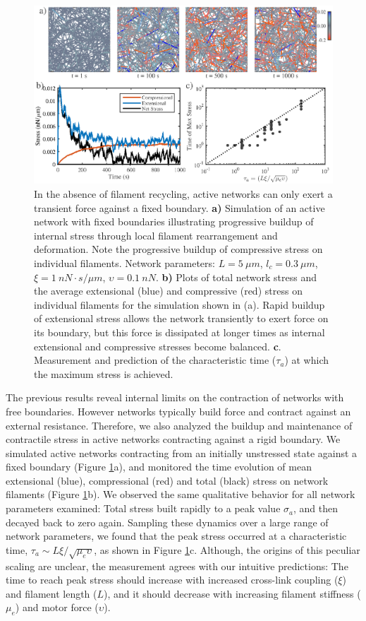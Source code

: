 \documentclass[10pt,letterpaper]{article}
\begin{document}
\begin{figure}[h!]
	\centering
	\includegraphics[width=\hsize]{figures/figure6}
	\caption{\label{fig:active_str} In the absence of filament recycling, active networks can only exert a transient force against a fixed boundary.  \textbf{a)} Simulation of an active network with fixed boundaries illustrating progressive buildup of internal stress through local filament rearrangement and deformation. Note the progressive buildup of compressive stress on individual filaments. Network parameters: $L=5\: \mu m$, $l_c=0.3\: \mu m$, $\xi=1\: nN\cdot s/\mu m$, $\upsilon=0.1\: nN$.  \textbf{b)} Plots of total network stress and the average extensional (blue) and compressive (red) stress on individual filaments for the simulation shown in (a). Rapid buildup of extensional stress allows the network transiently to exert force on its boundary, but this force is dissipated at longer times as internal extensional and compressive stresses become balanced. \textbf{c}. Measurement and prediction of the characteristic time ($\tau_a$) at which the maximum stress is achieved. }
\end{figure}

The previous results reveal internal limits on the contraction of networks with free boundaries.  However networks typically build force and contract against an external resistance.  Therefore, we also analyzed the buildup and maintenance of contractile stress in active networks contracting against a rigid boundary. We simulated active networks contracting from an initially unstressed state against a fixed boundary (Figure \ref{fig:active_str}a), and  monitored the time evolution of mean extensional (blue), compressional (red) and total (black) stress on network filaments (Figure \ref{fig:active_str}b). We observed the same qualitative behavior for all network parameters examined: Total stress built rapidly to a peak value $\sigma_a$, and then decayed back to zero again.  Sampling these dynamics over a large range of network parameters, we found that the peak stress occurred at a characteristic time, $\tau_a\sim L\xi/\sqrt{\mu_e\upsilon}$, as shown in Figure \ref{fig:active_str}c. Although, the origins of this peculiar scaling are unclear, the measurement agrees with our intuitive predictions: The time to reach peak stress should increase with increased cross-link coupling ($\xi$) and filament length ($L$), and it should decrease with increasing filament stiffness ($\mu_e$) and motor force ($\upsilon$).  
\end{document}
